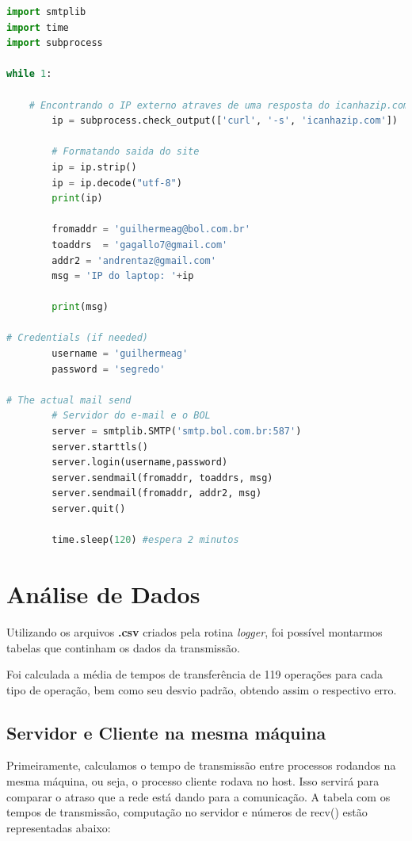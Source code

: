 \documentclass[10pt,a4paper]{report}
\begin{document}
\begin{lstlisting}[language=Python]
import smtplib
import time
import subprocess

while 1:

	# Encontrando o IP externo atraves de uma resposta do icanhazip.com
        ip = subprocess.check_output(['curl', '-s', 'icanhazip.com'])
        
        # Formatando saida do site
        ip = ip.strip()
        ip = ip.decode("utf-8")
        print(ip)

        fromaddr = 'guilhermeag@bol.com.br'
        toaddrs  = 'gagallo7@gmail.com'
        addr2 = 'andrentaz@gmail.com'
        msg = 'IP do laptop: '+ip

        print(msg)

# Credentials (if needed)
        username = 'guilhermeag'
        password = 'segredo'

# The actual mail send
		# Servidor do e-mail e o BOL
        server = smtplib.SMTP('smtp.bol.com.br:587')
        server.starttls()
        server.login(username,password)
        server.sendmail(fromaddr, toaddrs, msg)
        server.sendmail(fromaddr, addr2, msg)
        server.quit()

        time.sleep(120) #espera 2 minutos
\end{lstlisting}

\chapter{Análise de Dados}
Utilizando os arquivos \textbf{.csv} criados pela rotina \emph{logger}, foi possível montarmos tabelas que continham os dados da transmissão.

	Foi calculada a média de tempos de transferência de 119 operações para cada tipo de operação, bem como seu desvio padrão, obtendo assim o respectivo erro.
	
\section{Servidor e Cliente na mesma máquina}	
	Primeiramente, calculamos o tempo de transmissão entre processos rodandos na mesma máquina, ou seja, o processo cliente rodava no host. Isso servirá para comparar o atraso que a rede está dando para a comunicação. A tabela com os tempos de transmissão, computação no servidor e números de recv() estão representadas abaixo:
\end{document}
